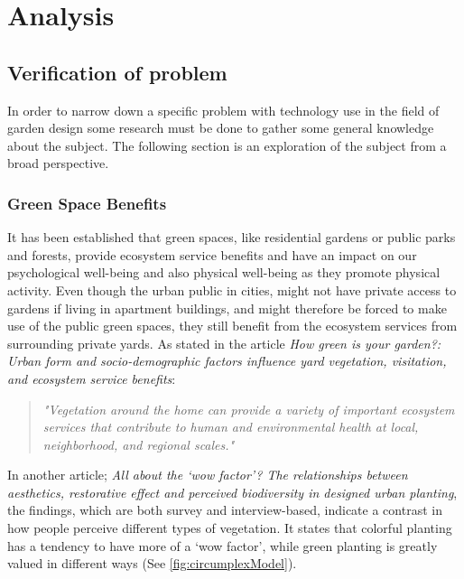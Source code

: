 \chapter{Analysis}	
		
	\section{Verification of problem}\label{sec:verification}
	In order to narrow down a specific problem with technology use in the field of garden design some research must be done to gather some general knowledge about the subject. The following section is an exploration of the subject from a broad perspective.
		
 	\subsection{Green Space Benefits}
	It has been established that green spaces, like residential gardens or public parks and forests, provide ecosystem service benefits and have an impact on our psychological well-being and also physical well-being as they promote physical activity\cite{urbanGreenSpace}\cite{healthBenefitsNature}. Even though the urban public in cities, might not have private access to gardens if living in apartment buildings, and might therefore be forced to make use of the public green spaces, they still benefit from the ecosystem services from surrounding private yards\cite{greenSpaceBenefits}. As stated in the article \textit{How green is your garden?: Urban form and socio-demographic factors influence yard vegetation, visitation, and ecosystem service benefits}:\\
	
	\begin{quote}
		\textit{"Vegetation around the home can provide a variety of important ecosystem services that contribute to human and environmental health at local, neighborhood, and regional scales\label{articleQuote}."}\\
	\end{quote}
	
	In another article; \textit{All about the ‘wow factor’? The relationships between aesthetics, restorative effect and perceived biodiversity in designed urban planting}\cite{wowFactor}, the findings, which are both survey and interview-based, indicate a contrast in how people perceive different types of vegetation. It states that colorful planting has a tendency to have more of a ‘wow factor’, while green planting is greatly valued in different ways (See \autoref{fig:circumplexModel}).
	
